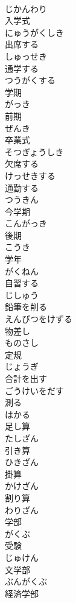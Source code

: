 \documentclass[8pt]{extreport}
\begin{document}
\begin{CJK}{UTF8}{min}
\\	じかんわり
\\	入学式	
\\	にゅうがくしき
\\	出席する	
\\	しゅっせき
\\	通学する	
\\	つうがくする
\\	学期	
\\	がっき
\\	前期	
\\	ぜんき
\\	卒業式	
\\	そつぎょうしき
\\	欠席する	
\\	けっせきする
\\	通勤する	
\\	つうきん
\\	今学期	
\\	こんがっき
\\	後期	
\\	こうき
\\	学年	
\\	がくねん
\\	自習する	
\\	じしゅう
\\	鉛筆を削る	
\\	えんぴつをけずる
\\	物差し	
\\	ものさし
\\	定規	
\\	じょうぎ
\\	合計を出す	
\\	ごうけいをだす
\\	測る	
\\	はかる
\\	足し算	
\\	たしざん
\\	引き算	
\\	ひきざん
\\	掛算	
\\	かけざん
\\	割り算	
\\	わりざん
\\	学部	
\\	がくぶ
\\	受験	
\\	じゅけん
\\	文学部	
\\	ぶんがくぶ
\\	経済学部	

\end{CJK}
\end{document}
